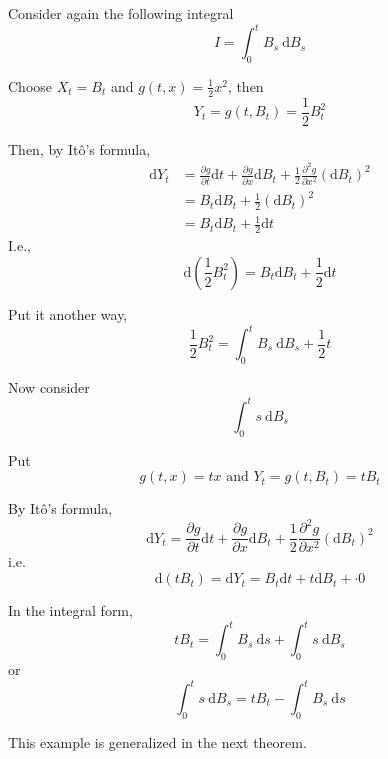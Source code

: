 \begin{example}
    Consider again the following integral
    \begin{equation*}
        I = \int_0^t B_s ~\mathrm{d}B_s
    \end{equation*}

    Choose $X_t = B_t$ and $g(t,x) = \frac{1}{2}x^2$, then 
    \[
        Y_t = g(t,B_t) = \frac{1}{2}B_t^2
    \]

    Then, by Itô's formula,
    \begin{equation*}
        \begin{aligned}
            \mathrm{d}Y_t   &= \frac{\partial g}{\partial t} \mathrm{d}t + \frac{\partial g}{\partial x} \mathrm{d}B_t + \frac{1}{2}\frac{\partial^2 g}{\partial x^2} (\mathrm{d}B_t)^2 \\
                            &= B_t \mathrm{d}B_t + \frac{1}{2}(\mathrm{d}B_t)^2 \\
                            &= B_t \mathrm{d}B_t + \frac{1}{2} \mathrm{d}t
        \end{aligned}
    \end{equation*}
    I.e.,
    \[
        \mathrm{d}\left( \frac{1}{2} B_t^2 \right) = B_t \mathrm{d}B_t + \frac{1}{2} \mathrm{d}t
    \]

    Put it another way,
    \begin{equation*}
        \frac{1}{2} B_t^2 = \int_0^t B_s ~\mathrm{d}B_s + \frac{1}{2}t
    \end{equation*}
\end{example}

\begin{example}
    Now consider
    \[
        \int_0^t s ~\mathrm{d}B_s
    \]

    Put
    \[
        g(t,x) = tx \text{ and } Y_t = g(t,B_t) = tB_t
    \]

    By Itô's formula,
    \[
        \mathrm{d}Y_t = \frac{\partial g}{\partial t} \mathrm{d}t + \frac{\partial g}{\partial x} \mathrm{d}B_t + \frac{1}{2}\frac{\partial^2 g}{\partial x^2} (\mathrm{d}B_t)^2 
    \]
    i.e.
    \[
        \mathrm{d}(tB_t) = \mathrm{d}Y_t = B_t \mathrm{d}t + t \mathrm{d}B_t +  \cdot 0
    \]

    In the integral form,
    \[
        tB_t = \int_0^t B_s ~\mathrm{d}s + \int_0^t s ~\mathrm{d}B_s
    \]
    or
    \[
        \int_0^t s ~\mathrm{d}B_s = tB_t - \int_0^t B_s ~\mathrm{d}s
    \]
\end{example}

This example is generalized in the next theorem.


